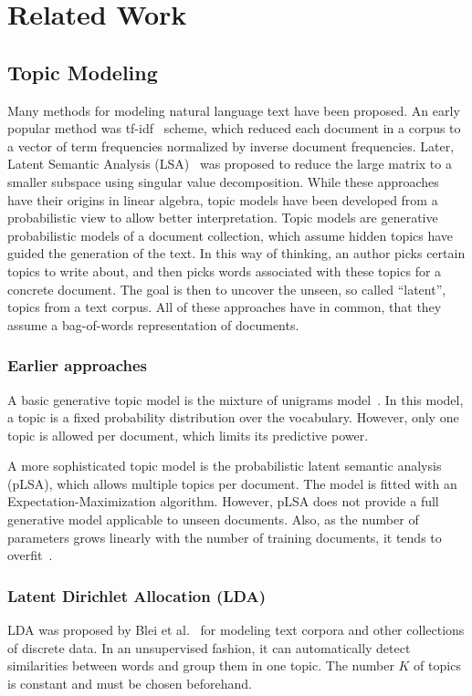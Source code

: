\documentclass{sig-alternate-05-2015}
\begin{document}
\section{Related Work}
\label{sec:related-work}
\subsection{Topic Modeling}

Many methods for modeling natural language text have been proposed.
An early popular method was tf-idf~\cite{SparckJones1972} scheme, which reduced each document in a corpus to a vector of term frequencies normalized by inverse document frequencies.
Later, Latent Semantic Analysis (LSA)~\cite{Deerwester1990} was proposed to reduce the large matrix to a smaller subspace using singular value decomposition.
While these approaches have their origins in linear algebra, topic models have been developed from a probabilistic view to allow better interpretation.
Topic models are generative probabilistic models of a document collection, which assume hidden topics have guided the generation of the text.
In this way of thinking, an author picks certain topics to write about, and then picks words associated with these topics for a concrete document.
The goal is then to uncover the unseen, so called ``latent'', topics from a text corpus.
All of these approaches have in common, that they assume a bag-of-words representation of documents.

\subsubsection{Earlier approaches}
A basic generative topic model is the mixture of unigrams model~\cite{Nigam2000}.
In this model, a topic is a fixed probability distribution over the vocabulary.
However, only one topic is allowed per document, which limits its predictive power.

A more sophisticated topic model is the probabilistic latent semantic analysis (pLSA), which allows multiple topics per document.
The model is fitted with an Expectation-Maximization algorithm.
However, pLSA does not provide a full generative model applicable to unseen documents.
Also, as the number of parameters grows linearly with the number of training documents, it tends to overfit~\cite{Blei2003}.

\subsubsection{Latent Dirichlet Allocation (LDA)}
LDA was proposed by Blei et al.~\cite{Blei2003} for modeling text corpora and other collections of discrete data.
In an unsupervised fashion, it can automatically detect similarities between words and group them in one topic.
The number $K$ of topics is constant and must be chosen beforehand.
\end{document}
